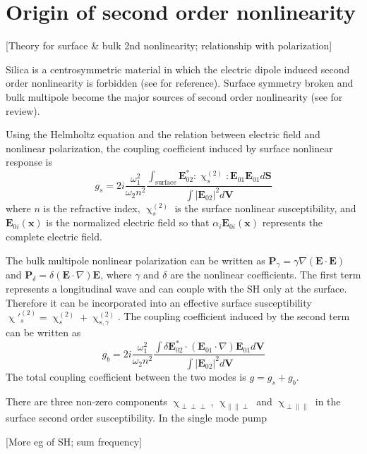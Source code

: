 \documentclass[a4paper,12pt,hyperref]{article}
\begin{document}
\section{Origin of second order nonlinearity}
[Theory for surface \& bulk 2nd nonlinearity; relationship with polarization]

Silica is a centrosymmetric material in which the electric dipole induced second order nonlinearity is forbidden (see \cite{boyd2003nonlinear} for reference). Surface symmetry broken and bulk multipole become the major sources of second order nonlinearity (see \cite{heinz1991second} for review). 

Using the Helmholtz equation and the relation between electric field and nonlinear polarization, the coupling coefficient induced by surface nonlinear response is
\begin{equation}
g_s = 2i\frac{\omega_1^2}{\omega_2n^2}\frac{\int_{\mathrm{surface} } \mathbf{E}_{02}^*:\upchi^{(2)}_s:\mathbf{E}_{01}\mathbf{E}_{01} d\mathbf{S}}{\int |\mathbf{E}_{02}|^2 d\mathbf{V}}
\end{equation}
where $n$ is the refractive index, $\upchi^{(2)}_s$ is the surface nonlinear susceptibility, and $\mathbf{E}_{0i}(\mathbf{x})$ is the  normalized electric field so that $\alpha_i\mathbf{E}_{0i}(\mathbf{x})$ represents the complete electric field. 

The bulk multipole nonlinear polarization can be written as $\mathbf{P}_\gamma =  \gamma\nabla(\mathbf{E}\cdot\mathbf{E})$ and $\mathbf{P}_\delta =  \delta(\mathbf{E}\cdot\nabla)\mathbf{E}$, where $\gamma$ and $\delta$ are the nonlinear coefficients. The first term represents a longitudinal wave and can couple with the SH only at the surface. Therefore it can be incorporated into an effective surface susceptibility $\upchi'^{(2)}_s = \upchi^{(2)}_s+\upchi^{(2)}_{s,\gamma}$\cite{heinz1991second}. The coupling coefficient induced by the second term can be written as %
\begin{equation}
g_b =  2i\frac{\omega_1^2}{\omega_2n^2}\frac{\int \delta\mathbf{E}_{02}^* \cdot (\mathbf{E}_{01}\cdot\nabla)\mathbf{E}_{01} d\mathbf{V}}{\int |\mathbf{E}_{02}|^2 d\mathbf{V}}
\label{eq:gb}
\end{equation}
The total coupling coefficient between the two modes is $g = g_s+g_b$. 

There are three non-zero components $\upchi_{\perp \perp \perp}$, $\upchi_{\parallel \parallel \perp}$ and $\upchi_{\perp \parallel \parallel}$ in the surface second order susceptibility. In the single mode pump



[More eg of SH; sum frequency]






\end{document}
